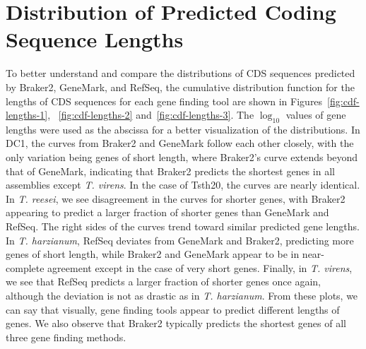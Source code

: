 \section{Distribution of Predicted Coding Sequence Lengths}\label{section:lengths}

To better understand and compare the distributions of CDS sequences
predicted by Braker2, GeneMark, and RefSeq, the cumulative
distribution function for the lengths of CDS sequences for each gene
finding tool are shown in Figures~\ref{fig:cdf-lengths-1},
~\ref{fig:cdf-lengths-2} and~\ref{fig:cdf-lengths-3}. The $\log_{10}$
values of gene lengths were used as the abscissa for a better
visualization of the distributions. In DC1, the curves from Braker2 and
GeneMark follow each other closely, with the only variation being
genes of short length, where Braker2's curve extends beyond that of
GeneMark, indicating that Braker2 predicts the shortest genes in all
assemblies except \textit{T. virens}. In the case of Tsth20, the
curves are nearly identical. In \textit{T. reesei}, we see
disagreement in the curves for shorter genes, with Braker2 appearing
to predict a larger fraction of shorter genes than GeneMark and
RefSeq. The right sides of the curves trend toward similar predicted
gene lengths. In \textit{T. harzianum}, RefSeq deviates from GeneMark
and Braker2, predicting more genes of short length, while Braker2 and
GeneMark appear to be in near-complete agreement except in the case of
very short genes. Finally, in \textit{T. virens}, we see that RefSeq predicts a larger fraction of shorter genes once again,
although the deviation is not as drastic as in
\textit{T. harzianum}. From these plots, we can say that visually, gene
finding tools appear to predict different lengths of genes. We also
observe that Braker2 typically predicts the shortest genes of all
three gene finding methods.

